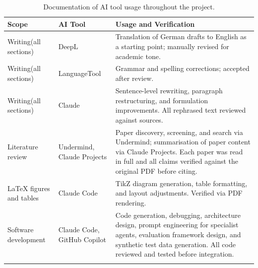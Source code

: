 \begin{table}[ht]
\begin{center}
\begin{minipage}{\textwidth}
\caption[AI usage documentation]{Documentation of AI tool usage throughout the project.}\label{tab:ai_usage}
\small
\begin{tabularx}{\textwidth}{p{2.8cm}p{2.2cm}X}
\toprule
\textbf{Scope} & \textbf{AI Tool} & \textbf{Usage and Verification} \\
\midrule

Writing\newline(all sections) & DeepL & Translation of German drafts to English as a starting point; manually revised for academic tone. \\
\addlinespace

Writing\newline(all sections) & LanguageTool & Grammar and spelling corrections; accepted after review. \\
\addlinespace

Writing\newline(all sections) & Claude & Sentence-level rewriting, paragraph restructuring, and formulation improvements. All rephrased text reviewed against sources. \\
\addlinespace

Literature review & Undermind, Claude Projects & Paper discovery, screening, and search via Undermind; summarisation of paper content via Claude Projects. Each paper was read in full and all claims verified against the original PDF before citing. \\
\addlinespace

\LaTeX{} figures and tables & Claude Code & TikZ diagram generation, table formatting, and layout adjustments. Verified via PDF rendering. \\
\addlinespace

Software development & Claude Code, GitHub Copilot & Code generation, debugging, architecture design, prompt engineering for specialist agents, evaluation framework design, and synthetic test data generation. All code reviewed and tested before integration. \\

\botrule
\end{tabularx}
\end{minipage}
\end{center}
\end{table}

